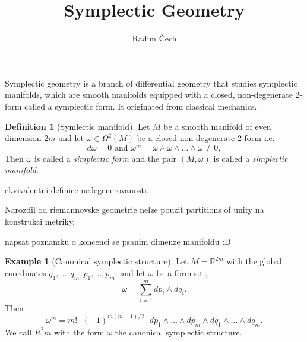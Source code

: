 \documentclass{article}
\title{Symplectic Geometry}
\author{Radim Čech}
\theoremstyle{definition}
\newtheorem{definition}[theorem]{Definition}
\newtheorem{example}[theorem]{Example}
\begin{document}
\maketitle

\noindent Symplectic geometry is a branch of differential geometry that studies symplectic manifolds, which are smooth manifolds equipped with a closed, non-degenerate 2-form called a symplectic form. It originated from classical mechanics.

\begin{definition}[Symlectic manifold]
    Let $M$ be a smooth manifold of even dimension $2m$ and let $\omega \in \Omega^2(M)$ be a closed non degenerate 2-form i.e.
    \begin{equation*}
        d\omega = 0 \text{ and } \omega^m = \omega \wedge \omega \wedge \dots \wedge \omega \not = 0,
    \end{equation*}
    Then $\omega$ is called a \textit{simplectic form} and the pair $(M, \omega)$ is called a \textit{simplectic manifold}.
\end{definition}

ekvivalentni definice nedegenerovanosti.

Narozdil od riemannovske geometrie nelze pouzit partitions of unity na konstrukci metriky.

napsat poznamku o koncenci se psanim dimenze manifoldu :D


\begin{example}[Canonical symplectic structure]
    Let $M = \mathbb{R}^{2m}$ with the global coordinates ${q_1, \dots, q_m, p_1, \dots, p_m}$. and let $\omega$ be a form s.t., 
    \begin{equation*}
        \omega = \sum_{i=1}^m dp_i \wedge dq_i.
    \end{equation*}
    Then 
    \begin{equation*}
        \omega^m = m! \cdot (-1)^{m(m-1)/2} \cdot dp_1 \wedge \dots \wedge dp_m \wedge dq_1 \wedge \dots \wedge dq_m.
    \end{equation*}
    We call $R^2m$ with the form $\omega$ the canonical symplectic structure.
\end{example}
\end{document}
